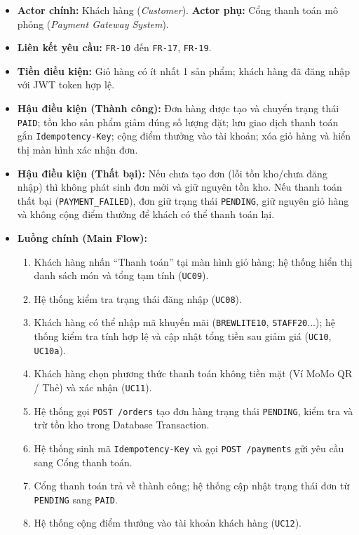 \begin{itemize}
    \item \textbf{Actor chính:} Khách hàng (\textit{Customer}). \textbf{Actor phụ:} Cổng thanh toán mô phỏng (\textit{Payment Gateway System}).
    \item \textbf{Liên kết yêu cầu:} \texttt{FR-10} đến \texttt{FR-17}, \texttt{FR-19}.
    \item \textbf{Tiền điều kiện:} Giỏ hàng có ít nhất 1 sản phẩm; khách hàng đã đăng nhập với JWT token hợp lệ.
    \item \textbf{Hậu điều kiện (Thành công):} Đơn hàng được tạo và chuyển trạng thái \texttt{PAID}; tồn kho sản phẩm giảm đúng số lượng đặt; lưu giao dịch thanh toán gắn \texttt{Idempotency-Key}; cộng điểm thưởng vào tài khoản; xóa giỏ hàng và hiển thị màn hình xác nhận đơn.
    \item \textbf{Hậu điều kiện (Thất bại):} Nếu chưa tạo đơn (lỗi tồn kho/chưa đăng nhập) thì không phát sinh đơn mới và giữ nguyên tồn kho. Nếu thanh toán thất bại (\texttt{PAYMENT\_FAILED}), đơn giữ trạng thái \texttt{PENDING}, giữ nguyên giỏ hàng và không cộng điểm thưởng để khách có thể thanh toán lại.
    \item \textbf{Luồng chính (Main Flow):}
    \begin{enumerate}
        \item Khách hàng nhấn ``Thanh toán'' tại màn hình giỏ hàng; hệ thống hiển thị danh sách món và tổng tạm tính (\texttt{UC09}).
        \item Hệ thống kiểm tra trạng thái đăng nhập (\texttt{UC08}).
        \item Khách hàng có thể nhập mã khuyến mãi (\texttt{BREWLITE10}, \texttt{STAFF20}...); hệ thống kiểm tra tính hợp lệ và cập nhật tổng tiền sau giảm giá (\texttt{UC10}, \texttt{UC10a}).
        \item Khách hàng chọn phương thức thanh toán không tiền mặt (Ví MoMo QR / Thẻ) và xác nhận (\texttt{UC11}).
        \item Hệ thống gọi \texttt{POST /orders} tạo đơn hàng trạng thái \texttt{PENDING}, kiểm tra và trừ tồn kho trong Database Transaction.
        \item Hệ thống sinh mã \texttt{Idempotency-Key} và gọi \texttt{POST /payments} gửi yêu cầu sang Cổng thanh toán.
        \item Cổng thanh toán trả về thành công; hệ thống cập nhật trạng thái đơn từ \texttt{PENDING} sang \texttt{PAID}.
        \item Hệ thống cộng điểm thưởng vào tài khoản khách hàng (\texttt{UC12}).

\end{enumerate}
\end{itemize}
